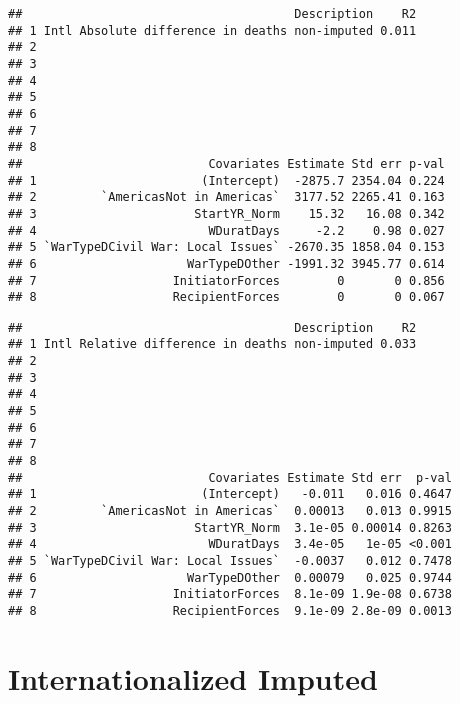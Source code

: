 \documentclass[
]{article}
\begin{document}
\begin{verbatim}
##                                      Description    R2
## 1 Intl Absolute difference in deaths non-imputed 0.011
## 2                                                     
## 3                                                     
## 4                                                     
## 5                                                     
## 6                                                     
## 7                                                     
## 8                                                     
##                          Covariates Estimate Std err p-val
## 1                       (Intercept)  -2875.7 2354.04 0.224
## 2         `AmericasNot in Americas`  3177.52 2265.41 0.163
## 3                      StartYR_Norm    15.32   16.08 0.342
## 4                        WDuratDays     -2.2    0.98 0.027
## 5 `WarTypeDCivil War: Local Issues` -2670.35 1858.04 0.153
## 6                     WarTypeDOther -1991.32 3945.77 0.614
## 7                   InitiatorForces        0       0 0.856
## 8                   RecipientForces        0       0 0.067
\end{verbatim}

\begin{verbatim}
##                                      Description    R2
## 1 Intl Relative difference in deaths non-imputed 0.033
## 2                                                     
## 3                                                     
## 4                                                     
## 5                                                     
## 6                                                     
## 7                                                     
## 8                                                     
##                          Covariates Estimate Std err  p-val
## 1                       (Intercept)   -0.011   0.016 0.4647
## 2         `AmericasNot in Americas`  0.00013   0.013 0.9915
## 3                      StartYR_Norm  3.1e-05 0.00014 0.8263
## 4                        WDuratDays  3.4e-05   1e-05 <0.001
## 5 `WarTypeDCivil War: Local Issues`  -0.0037   0.012 0.7478
## 6                     WarTypeDOther  0.00079   0.025 0.9744
## 7                   InitiatorForces  8.1e-09 1.9e-08 0.6738
## 8                   RecipientForces  9.1e-09 2.8e-09 0.0013
\end{verbatim}

\hypertarget{internationalized-imputed}{%
\section{Internationalized Imputed}\label{internationalized-imputed}}
\end{document}
